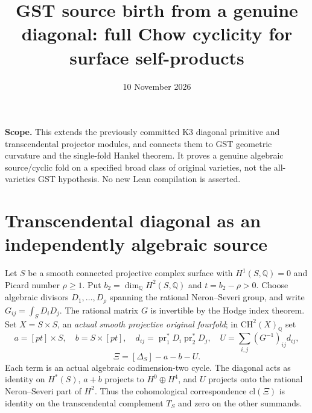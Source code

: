 \documentclass[11pt]{article}
\title{GST source birth from a genuine diagonal: full Chow cyclicity for surface self-products}
\date{10 November 2026}
\newcommand{\Q}{\mathbb Q}
\newcommand{\CH}{\mathrm{CH}}
\newcommand{\cl}{\mathrm{cl}}
\begin{document}
\maketitle
\noindent\textbf{Scope.} This extends the previously committed K3 diagonal primitive and transcendental projector modules, and connects them to GST geometric curvature and the single-fold Hankel theorem. It proves a genuine algebraic source/cyclic fold on a specified broad class of original varieties, not the all-varieties GST hypothesis. No new Lean compilation is asserted.

\section{Transcendental diagonal as an independently algebraic source}
Let $S$ be a smooth connected projective complex surface with $H^1(S,\Q)=0$ and Picard number $\rho\ge1$. Put $b_2=\dim_\Q H^2(S,\Q)$ and $t=b_2-\rho>0$. Choose algebraic divisors $D_1,\ldots,D_\rho$ spanning the rational Neron--Severi group, and write $G_{ij}=\int_SD_iD_j$. The rational matrix $G$ is invertible by the Hodge index theorem. Set $X=S\times S$, an \emph{actual smooth projective original fourfold}; in $\CH^2(X)_\Q$ set
\[
a=[pt]\times S,\quad b=S\times[pt],\quad
d_{ij}=\operatorname{pr}_1^*D_i\operatorname{pr}_2^*D_j,\quad
U=\sum_{i,j}(G^{-1})_{ij}d_{ij},
\]
\[
\boxed{\Xi=[\Delta_S]-a-b-U.}
\]
Each term is an actual algebraic codimension-two cycle. The diagonal acts as identity on $H^*(S)$, $a+b$ projects to $H^0\oplus H^4$, and $U$ projects onto the rational Neron--Severi part of $H^2$. Thus the cohomological correspondence $\cl(\Xi)$ is identity on the transcendental complement $T_S$ and zero on the other summands.
\end{document}
